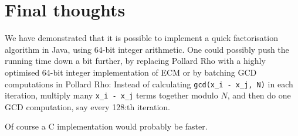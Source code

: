 \documentclass{article}
\begin{document}

\section{Final thoughts}
We have demonstrated that it is possible to implement a quick factorisation algorithm in Java, using 64-bit integer arithmetic. One could possibly push the running time down a bit further, by replacing Pollard Rho with a highly optimised 64-bit integer implementation of ECM or by batching GCD computations in Pollard Rho: Instead of calculating \verb!gcd(x_i - x_j, N)! in each iteration, multiply many \verb!x_i - x_j! terms together modulo $N$, and then do one GCD computation, say every 128:th iteration.

Of course a C implementation would probably be faster.



\end{document}
